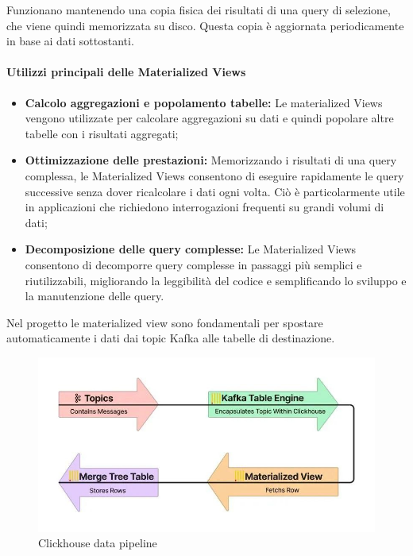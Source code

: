 Funzionano mantenendo una copia fisica dei risultati di una query di selezione, che viene quindi memorizzata su disco. Questa copia è aggiornata periodicamente in base ai dati sottostanti.

\paragraph{Utilizzi principali delle Materialized Views}
\begin{itemize}
    \item \textbf{Calcolo aggregazioni e popolamento tabelle:} Le materialized Views vengono utilizzate per calcolare aggregazioni su dati e quindi popolare altre tabelle con i risultati aggregati;
    \item \textbf{Ottimizzazione delle prestazioni:} Memorizzando i risultati di una query complessa, le Materialized Views consentono di eseguire rapidamente le query successive senza dover ricalcolare i dati ogni volta. Ciò è particolarmente utile in applicazioni che richiedono interrogazioni frequenti su grandi volumi di dati;
    \item \textbf{Decomposizione delle query complesse:} Le Materialized Views consentono di decomporre query complesse in passaggi più semplici e riutilizzabili, migliorando la leggibilità del codice e semplificando lo sviluppo e la manutenzione delle query.
\end{itemize}

Nel progetto le materialized view sono fondamentali per spostare automaticamente i dati dai topic Kafka alle tabelle di destinazione.
\begin{figure}[H]
  \centering
  \includegraphics[width=1\textwidth]{../Images/SpecificaTecnica/enginePipeline.jpg}
  \caption{Clickhouse data pipeline}
  \label{fig:data_pipeline_clickhouse}
\end{figure}

